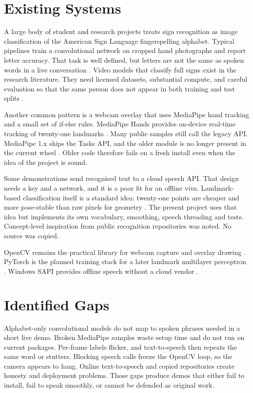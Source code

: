 \section{Existing Systems}
A large body of student and research projects treats sign recognition as image classification of the American Sign Language fingerspelling alphabet. Typical pipelines train a convolutional network on cropped hand photographs and report letter accuracy. That task is well defined, but letters are not the same as spoken words in a live conversation \cite{bragg2019}. Video models that classify full signs exist in the research literature. They need licensed datasets, substantial compute, and careful evaluation so that the same person does not appear in both training and test splits \cite{bragg2019}.

Another common pattern is a webcam overlay that uses MediaPipe hand tracking and a small set of if-else rules. MediaPipe Hands provides on-device real-time tracking of twenty-one landmarks \cite{mediapipehands}. Many public samples still call the legacy  API. MediaPipe 1.x ships the Tasks API, and the older module is no longer present in the current wheel \cite{mediapipehl}. Older code therefore fails on a fresh install even when the idea of the project is sound.

Some demonstrations send recognised text to a cloud speech API. That design needs a key and a network, and it is a poor fit for an offline viva. Landmark-based classification itself is a standard idea: twenty-one points are cheaper and more pose-stable than raw pixels for geometry \cite{mediapipehands}. The present project uses that idea but implements its own vocabulary, smoothing, speech threading and tests. Concept-level inspiration from public recognition repositories was noted. No source was copied.

OpenCV remains the practical library for webcam capture and overlay drawing \cite{opencv}. PyTorch is the planned training stack for a later landmark multilayer perceptron \cite{pytorch}. Windows SAPI provides offline speech without a cloud vendor \cite{sapi}.

\section{Identified Gaps}
Alphabet-only convolutional models do not map to spoken phrases needed in a short live demo. Broken MediaPipe samples waste setup time and do not run on current packages. Per-frame labels flicker, and text-to-speech then repeats the same word or stutters. Blocking speech calls freeze the OpenCV loop, so the camera appears to hang. Online text-to-speech and copied repositories create honesty and deployment problems. Those gaps produce demos that either fail to install, fail to speak smoothly, or cannot be defended as original work.

